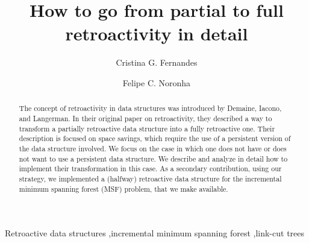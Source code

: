 \documentclass[3p,times,procedia]{elsarticle}
\begin{document}
\begin{frontmatter}




\title{How to go from partial to full retroactivity in detail}


\author[a]{Cristina G. Fernandes} 
\author[a]{Felipe C. Noronha}

\address[a]{Department of Computer Science, University of São Paulo, Brazil}

\begin{abstract}
  The concept of retroactivity in data structures was introduced by Demaine, Iacono, 
  and Langerman.  In their original paper on retroactivity, they described a way to 
  transform a partially retroactive data structure into a fully retroactive one.
  Their description is focused on space savings, which require the use of a
  persistent version of the data structure involved.  We focus on the case in 
  which one does not have or does not want to use a persistent data structure. 
  We describe and analyze in detail how to implement their transformation in this case.
  As a secondary contribution, using our strategy, we implemented a (halfway) 
  retroactive data structure for the incremental minimum spanning forest (MSF) problem, 
  that we make available. 
\end{abstract}

\begin{keyword}
  Retroactive data structures \sep incremental minimum spanning forest \sep link-cut trees
\end{keyword}


\end{frontmatter}
\end{document}
